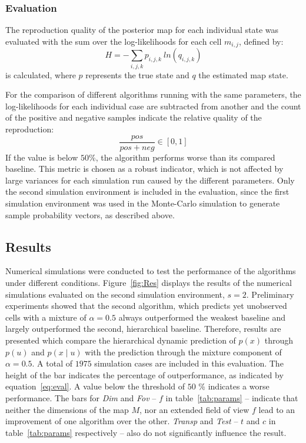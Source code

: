 \documentclass[twocolumn,letterpaper]{IEEEAerospaceCLS}  %
\begin{document}
\subsubsection{Evaluation}\label{ssec:SimMetEval}
The reproduction quality of the posterior map for each individual state was evaluated with the sum over the log-likelihoods for each cell $m_{i,j}$, defined by:
\begin{equation} \label{eq:Entropy}
    H = - \sum_{i,j,k} p_{i,j,k}~ln(q_{i,j,k})
\end{equation}
is calculated, where $p$ represents the true state and $q$ the estimated map state.

For the comparison of different algorithms running with the same parameters, the log-likelihoods for each individual case are subtracted from another and the count of the positive and negative samples indicate the relative quality of the reproduction:
\begin{equation} \label{eq:eval}
    \frac{pos}{pos+neg} \in [0, 1]
\end{equation} If the value is below $50$\%, the algorithm performs worse than its compared baseline. This metric is chosen as a robust indicator, which is not affected by large variances for each simulation run caused by the different parameters. 
Only the second simulation environment is included in the evaluation, since the first simulation environment was used in the Monte-Carlo simulation to generate sample probability vectors, as described above.

\subsection{Results} \label{ssec:SimRes}
Numerical simulations were conducted to test the performance of the algorithms under different conditions. Figure~\ref{fig:Res} displays the results of the numerical simulations evaluated on the second simulation environment, $s=2$. Preliminary experiments showed that the second algorithm, which predicts yet unobserved cells with a mixture of $\alpha = 0.5$ always outperformed the weakest baseline and largely outperformed the second, hierarchical baseline. Therefore, results are presented which compare the hierarchical dynamic prediction of $p(x)$ through $p(u)$ and $p(x\mid u)$ with the prediction through the mixture component of $\alpha = 0.5$. A total of $1975$ simulation cases are included in this evaluation. The height of the bar indicates the percentage of outperformance, as indicated by equation~\ref{eq:eval}. A value below the threshold of $50$ \% indicates a worse performance.
The bars for \emph{Dim} and \emph{Fov} -- $f$ in table~\ref{tab:params} -- indicate that neither the dimensions of the map $M$, nor an extended field of view $f$ lead to an improvement of one algorithm over the other. \emph{Transp} and \emph{Test} -- $t$ and $c$ in table~\ref{tab:params} respectively -- also do not significantly influence the result.
\end{document}
